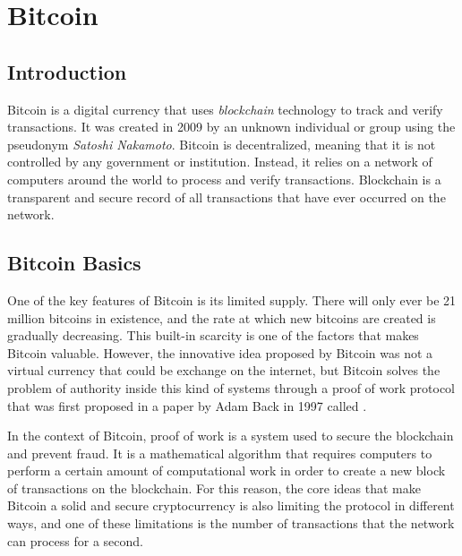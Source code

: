 \newcommand{\noteOnBitcoinNaming}[0]{\footnote{
    From now till the end of the document, we will use the word Bitcoin capitalized to identify the protocol,
    and the word bitcoin not capitalized to identify the currency
    }
}

\setcounter{page}{1}
\chapter{Bitcoin}
\label{chap:bitcoin}

\section{Introduction}

Bitcoin is a digital currency that uses \emph{blockchain} technology to track
and verify transactions. It was created in 2009 by an unknown individual or
group using the pseudonym \emph{Satoshi Nakamoto}.
Bitcoin is decentralized, meaning that it is not controlled by any government
or institution. Instead, it relies on a network of computers around the world
to process and verify transactions.
 Blockchain is a transparent and secure record of all transactions that have
ever occurred on the network.

\section{Bitcoin Basics}
\label{sec:basics}

One of the key features of Bitcoin is its limited supply. There will only ever
be 21 million bitcoins in existence, and the rate at which new bitcoins are
created is gradually decreasing. This built-in scarcity is one of the factors
that makes Bitcoin valuable.
However, the innovative idea proposed by Bitcoin was not a virtual currency that could be
exchange on the internet, but Bitcoin solves the problem of authority inside this kind
of systems through a proof of work protocol that was first proposed in a paper
by Adam Back in 1997 called  \cite{hashcash}.

In the context of Bitcoin, proof of work is a system used to secure the
blockchain and prevent fraud. It is a mathematical algorithm that requires computers
to perform a certain amount of computational work in order to create a new
block of transactions on the blockchain.
For this reason, the core ideas that make Bitcoin a solid and secure cryptocurrency 
is also limiting the protocol in different ways, and one of these limitations is the number of
transactions that the network can process for a second.


